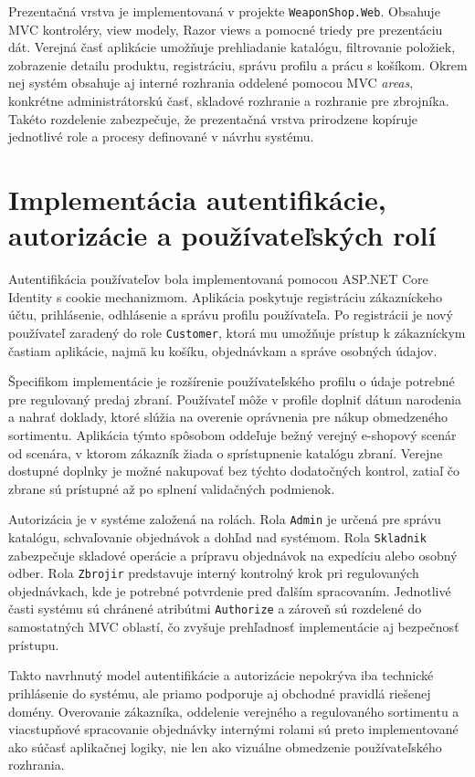 Prezentačná vrstva je implementovaná v projekte \texttt{WeaponShop.Web}. Obsahuje MVC kontroléry, view modely, Razor views a pomocné triedy pre prezentáciu dát. Verejná časť aplikácie umožňuje prehliadanie katalógu, filtrovanie položiek, zobrazenie detailu produktu, registráciu, správu profilu a prácu s košíkom. Okrem nej systém obsahuje aj interné rozhrania oddelené pomocou MVC \emph{areas}, konkrétne administrátorskú časť, skladové rozhranie a rozhranie pre zbrojníka. Takéto rozdelenie zabezpečuje, že prezentačná vrstva prirodzene kopíruje jednotlivé role a procesy definované v návrhu systému.

\section{Implementácia autentifikácie, autorizácie a používateľských rolí}
\label{sec:implementation-auth}

Autentifikácia používateľov bola implementovaná pomocou ASP.NET Core Identity s cookie mechanizmom. Aplikácia poskytuje registráciu zákazníckeho účtu, prihlásenie, odhlásenie a správu profilu používateľa. Po registrácii je nový používateľ zaradený do role \texttt{Customer}, ktorá mu umožňuje prístup k zákazníckym častiam aplikácie, najmä ku košíku, objednávkam a správe osobných údajov.

Špecifikom implementácie je rozšírenie používateľského profilu o údaje potrebné pre regulovaný predaj zbraní. Používateľ môže v profile doplniť dátum narodenia a nahrať doklady, ktoré slúžia na overenie oprávnenia pre nákup obmedzeného sortimentu. Aplikácia týmto spôsobom oddeľuje bežný verejný e-shopový scenár od scenára, v ktorom zákazník žiada o sprístupnenie katalógu zbraní. Verejne dostupné doplnky je možné nakupovať bez týchto dodatočných kontrol, zatiaľ čo zbrane sú prístupné až po splnení validačných podmienok.

Autorizácia je v systéme založená na rolách. Rola \texttt{Admin} je určená pre správu katalógu, schvaľovanie objednávok a dohľad nad systémom. Rola \texttt{Skladnik} zabezpečuje skladové operácie a prípravu objednávok na expedíciu alebo osobný odber. Rola \texttt{Zbrojir} predstavuje interný kontrolný krok pri regulovaných objednávkach, kde je potrebné potvrdenie pred ďalším spracovaním. Jednotlivé časti systému sú chránené atribútmi \texttt{Authorize} a zároveň sú rozdelené do samostatných MVC oblastí, čo zvyšuje prehľadnosť implementácie aj bezpečnosť prístupu.

Takto navrhnutý model autentifikácie a autorizácie nepokrýva iba technické prihlásenie do systému, ale priamo podporuje aj obchodné pravidlá riešenej domény. Overovanie zákazníka, oddelenie verejného a regulovaného sortimentu a viacstupňové spracovanie objednávky internými rolami sú preto implementované ako súčasť aplikačnej logiky, nie len ako vizuálne obmedzenie používateľského rozhrania.
